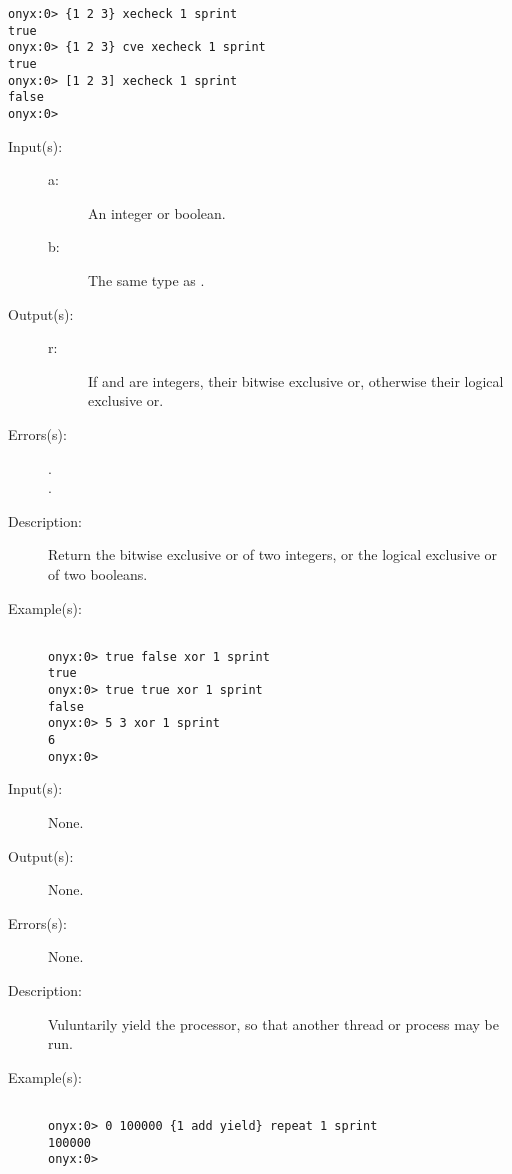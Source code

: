 \begin{description}
\begin{description}
\begin{verbatim}
onyx:0> {1 2 3} xecheck 1 sprint
true
onyx:0> {1 2 3} cve xecheck 1 sprint
true
onyx:0> [1 2 3] xecheck 1 sprint
false
onyx:0>
		\end{verbatim}
	\end{description}
\label{systemdict:xor}
\item[{\onyxop{a b}{xor}{r}}: ]
	\begin{description}\item[]
	\item[Input(s): ]
		\begin{description}\item[]
		\item[a: ]
			An integer or boolean.
		\item[b: ]
			The same type as .
		\end{description}
	\item[Output(s): ]
		\begin{description}\item[]
		\item[r: ]
			If  and  are integers, their bitwise
			exclusive or, otherwise their logical exclusive or.
		\end{description}
	\item[Errors(s): ]
		\begin{description}\item[]
		\item[.]
		\item[.]
		\end{description}
	\item[Description: ]
		Return the bitwise exclusive or of two integers, or the logical
		exclusive or of two booleans.
	\item[Example(s): ]\begin{verbatim}

onyx:0> true false xor 1 sprint
true
onyx:0> true true xor 1 sprint
false
onyx:0> 5 3 xor 1 sprint
6
onyx:0>
		\end{verbatim}
	\end{description}
\label{systemdict:yield}
\item[{\onyxop{--}{yield}{--}}: ]
	\begin{description}\item[]
	\item[Input(s): ] None.
	\item[Output(s): ] None.
	\item[Errors(s): ] None.
	\item[Description: ]
		Vuluntarily yield the processor, so that another thread or
		process may be run.
	\item[Example(s): ]\begin{verbatim}

onyx:0> 0 100000 {1 add yield} repeat 1 sprint
100000
onyx:0>
		\end{verbatim}
	\end{description}
\end{description}
